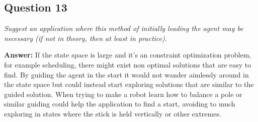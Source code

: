 \documentclass[a4paper]{article}
\begin{document}
\subsection*{Question 13}
\emph{Suggest an application where this method of initially leading the
agent may be necessary (if not in theory, then at least in practice).}

\textbf{Answer:} If the state space is large and it's an constraint optimization problem, for example scheduling, there might exist non optimal solutions that are easy to find. By guiding the agent in the start it would not wander aimlessly around in the state space but could instead start exploring solutions that are similar to the guided solution. 
When trying to make a robot learn how to balance a pole or similar guiding could help the application to find a start, avoiding to much exploring in states where the stick is held vertically or other extremes.
\end{document}

